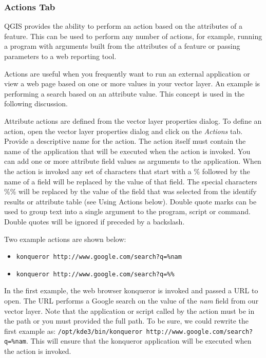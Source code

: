 \subsubsection{Actions Tab}\label{label_actions}

QGIS provides the ability to perform an action based on the attributes of a
feature. This can be used to perform any number of actions, for example,
running a program with arguments built from the attributes of a feature or
passing parameters to a web reporting tool.

Actions are useful when you frequently want to run an external application or
view a web page based on one or more values in your vector layer. An example
is performing a search based on an attribute value. This concept is used in 
the following discussion.


Attribute actions are defined from the vector layer properties dialog. To
define an action, open the vector layer properties dialog and click on the
\textit{Actions} tab. Provide a descriptive name for the action. The action
itself must contain the name of the application that will be executed when the
action is invoked. You can add one or more attribute field values as arguments
to the application. When the action is invoked any set of characters that
start with a \% followed by the name of a field will be replaced by the value of
that field. The special characters \%\% \index{\%\%}will be replaced by the value
of the field that was selected from the identify results or attribute table (see
Using Actions below).  Double quote marks can be used to group text into a
single argument to the program, script or command. Double quotes will be
ignored if preceded by a backslash.

Two example actions are shown below:

\begin{itemize}
  \item \texttt{konqueror http://www.google.com/search?q=\%nam}
  \item \texttt{konqueror http://www.google.com/search?q=\%\%}
\end{itemize}


In the first example, the web browser konqueror is invoked and passed a URL to
open. The URL performs a Google search on the value of the \textit{nam} field
from our vector layer. Note that the application or script called by the
action must be in the path or you must provided the full path. To be sure, we could
rewrite the first example as: \texttt{/opt/kde3/bin/konqueror
http://www.google.com/search?q=\%nam}. This will ensure that the konqueror
application will be executed when the action is invoked.

